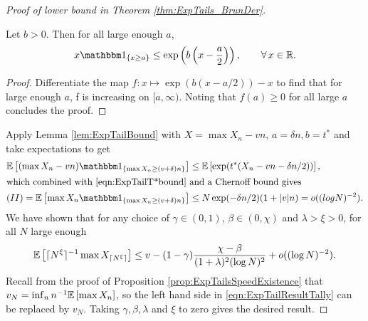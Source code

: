 \begin{proof}[Proof of lower bound in Theorem \ref{thm:ExpTails_BrunDer}]
\begin{lemma} \label{lem:ExpTailBound}
Let $b > 0$. Then for all large enough $a$, 
\begin{equation}
x \Ind_{\{x \geq a\}} \leq \exp\left(b\left(x - \frac{a}{2}\right)\right), \qquad\forall\, x \in \R. 
\end{equation}
\end{lemma}
\begin{proof}
Differentiate the map $f:x \mapsto \exp(b(x - a/2)) - x$ to find that for large enough $a$, f is increasing on $[a, \infty)$. Noting that $f(a) \geq 0$ for all large $a$ concludes the proof.  
\end{proof}
Apply Lemma \ref{lem:ExpTailBound} with $X = \max X_n - vn$, $a = \delta n, b = t^*$ and take expectations to get 
\begin{align*}
\Ex{(\max X_n - vn) \Ind_{\{\max X_n \geq (v + \delta)n\}}} &\leq \Ex{\exp(t^*(X_n - vn - \delta n / 2))}, \nonumber \\
\intertext{which combined with \ref{eqn:ExpTailT*bound} and a Chernoff bound gives}
(II) = \Ex{\max X_n \Ind_{\{\max X_n \geq (v + \delta)n\}}} &\leq N \exp(-\delta n /2) (1 + |v|n) = o((log N)^{-2}). 
\end{align*}
We have shown that for any choice of $\gamma \in (0,1)$, $\beta \in (0, \chi)$ and $\lambda > \xi > 0$, for all $N$ large enough
\begin{equation}\label{eqn:ExpTailResultTally}
\mathbb{E}\left[ \lceil N^\xi\rceil^{-1} \max X_{\lceil N^\xi\rceil} \right] \leq v - (1 - \gamma)\frac{\chi - \beta}{(1 + \lambda)^2(\log N)^2} + o((\log N)^{-2}). 
\end{equation}
Recall from the proof of Proposition \ref{prop:ExpTailsSpeedExistence} that $v_N = \inf_n n^{-1} \mathbb{E}\left[ \max X_n \right]$, so the left hand side in \ref{eqn:ExpTailResultTally} can be replaced by $v_N$. Taking $\gamma, \beta, \lambda$ and $\xi$ to zero gives the desired result. 
\end{proof}